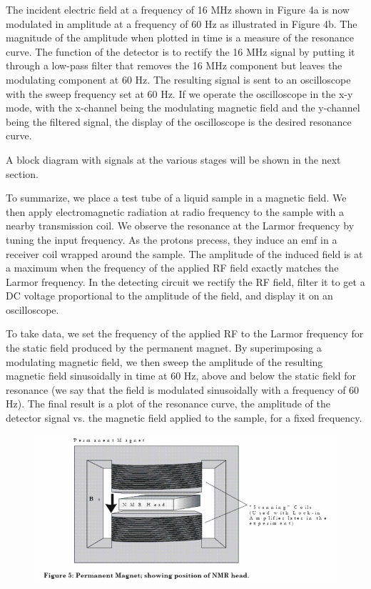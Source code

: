 \documentclass{../lab}
\begin{document}
The incident electric field at a frequency of 16 MHz shown in Figure 4a is now modulated in amplitude at a frequency of 60 Hz as illustrated in Figure 4b. The magnitude of the amplitude when plotted in time is a measure of the resonance curve. The function of the detector is to rectify the 16 MHz signal by putting it through a low-pass filter that removes the 16 MHz component but leaves the modulating component at 60 Hz. The resulting signal is sent to an oscilloscope with the sweep frequency set at 60 Hz. If we operate the oscilloscope in the x-y mode, with the x-channel being the modulating magnetic field and the y-channel being the filtered signal, the display of the oscilloscope is the desired resonance curve.

A block diagram with signals at the various stages will be shown in the next section.

To summarize, we place a test tube of a liquid sample in a magnetic field. We then apply electromagnetic radiation at radio frequency to the sample with a nearby transmission coil. We observe the resonance at the Larmor frequency by tuning the input frequency. As the protons precess, they induce an emf in a receiver coil wrapped around the sample. The amplitude of the induced field is at a maximum when the frequency of the applied RF field exactly matches the Larmor frequency. In the detecting circuit we rectify the RF field, filter it to get a DC voltage proportional to the amplitude of the field, and display it on an oscilloscope.

To take data, we set the frequency of the applied RF to the Larmor frequency for the static field produced by the permanent magnet. By superimposing a modulating magnetic field, we then sweep the amplitude of the resulting magnetic field sinusoidally in time at 60 Hz, above and below the static field for resonance (we say that the field is modulated sinusoidally with a frequency of 60 Hz). The final result is a plot of the resonance curve, the amplitude of the detector signal vs. the magnetic field applied to the sample, for a fixed frequency.


\begin{figure}[h]
    \centering
    \href{http://experimentationlab.berkeley.edu/sites/default/files/images/700px-NMR9.gif}{\includegraphics[width=0.5\linewidth]{images/700px-NMR9.png}}
    \caption{}
    \label{fig:700px-NMR9}
\end{figure}
\end{document}
